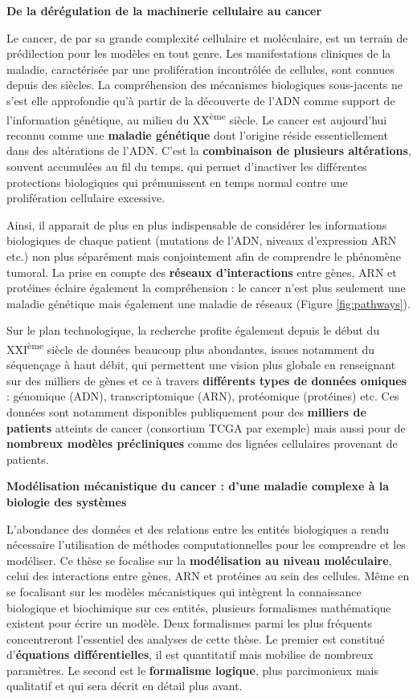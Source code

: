 \documentclass[a4paper,12pt,twoside,onecolumn,openright,final,oldfontcommands]{memoir}
\begin{document}
\textbf{De la dérégulation de la machinerie cellulaire au cancer}

Le cancer, de par sa grande complexité cellulaire et moléculaire, est un
terrain de prédilection pour les modèles en tout genre. Les
manifestations cliniques de la maladie, caractérisée par une
prolifération incontrôlée de cellules, sont connues depuis des siècles.
La compréhension des mécanismes biologiques sous-jacents ne s'est elle
approfondie qu'à partir de la découverte de l'ADN comme support de
l'information génétique, au milieu du XX\textsuperscript{ème} siècle. Le
cancer est aujourd'hui reconnu comme une \textbf{maladie génétique} dont
l'origine réside essentiellement dans des altérations de l'ADN. C'est la
\textbf{combinaison de plusieurs altérations}, souvent accumulées au fil
du temps, qui permet d'inactiver les différentes protections biologiques
qui prémunissent en temps normal contre une prolifération cellulaire
excessive.

Ainsi, il apparait de plus en plus indispensable de considérer les
informations biologiques de chaque patient (mutations de l'ADN, niveaux
d'expression ARN etc.) non plus séparément mais conjointement afin de
comprendre le phénomène tumoral. La prise en compte des \textbf{réseaux
d'interactions} entre gènes, ARN et protéines éclaire également la
compréhension : le cancer n'est plus seulement une maladie génétique
mais également une maladie de réseaux (Figure \ref{fig:pathways}).

Sur le plan technologique, la recherche profite également depuis le
début du XXI\textsuperscript{ème} siècle de données beaucoup plus
abondantes, issues notamment du séquençage à haut débit, qui permettent
une vision plus globale en renseignant sur des milliers de gènes et ce à
travers \textbf{différents types de données omiques} : génomique (ADN),
transcriptomique (ARN), protéomique (protéines) etc. Ces données sont
notamment disponibles publiquement pour des \textbf{milliers de
patients} atteints de cancer (consortium TCGA par exemple) mais aussi
pour de \textbf{nombreux modèles précliniques} comme des lignées
cellulaires provenant de patients.

\textbf{Modélisation mécanistique du cancer : d'une maladie complexe à
la biologie des systèmes}

L'abondance des données et des relations entre les entités biologiques a
rendu nécessaire l'utilisation de méthodes computationnelles pour les
comprendre et les modéliser. Ce thèse se focalise sur la
\textbf{modélisation au niveau moléculaire}, celui des interactions
entre gènes, ARN et protéines au sein des cellules. Même en se
focalisant sur les modèles mécanistiques qui intègrent la connaissance
biologique et biochimique sur ces entités, plusieurs formalismes
mathématique existent pour écrire un modèle. Deux formalismes parmi les
plus fréquents concentreront l'essentiel des analyses de cette thèse. Le
premier est constitué d'\textbf{équations différentielles}, il est
quantitatif mais mobilise de nombreux paramètres. Le second est le
\textbf{formalisme logique}, plus parcimonieux mais qualitatif et qui
sera décrit en détail plus avant.
\end{document}
